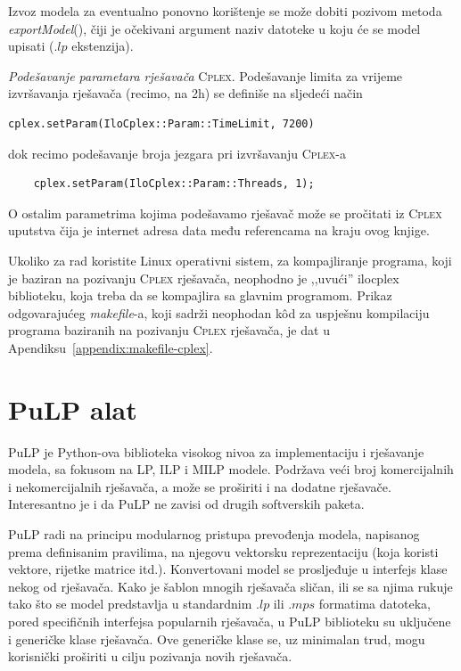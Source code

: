 \documentclass[b5paper, utf8, 11pt, colorlinks]{book}
\theoremstyle{definition}
\begin{document}
Izvoz modela za eventualno ponovno korištenje se može dobiti pozivom metoda \emph{exportModel}(), čiji je očekivani argument naziv datoteke u koju će se model upisati (.$lp$ ekstenzija).  

\emph{ {Podešavanje parametara rješavača}} \textrm{\textsc{Cplex}}. Podešavanje limita za vrijeme izvršavanja rješavača (recimo, na 2h) se definiše na sljedeći način
\begin{verbatim}
cplex.setParam(IloCplex::Param::TimeLimit, 7200)
\end{verbatim}
dok recimo podešavanje broja jezgara pri izvršavanju \textsc{Cplex}-a 
\begin{verbatim}
	cplex.setParam(IloCplex::Param::Threads, 1);
\end{verbatim}
O ostalim parametrima kojima podešavamo rješavač može se pročitati iz \textrm{\textsc{Cplex}} uputstva čija je internet adresa data  među referencama na kraju ovog knjige.

Ukoliko za rad koristite Linux operativni sistem, za kompajliranje programa, koji je baziran na pozivanju \textsc{Cplex} rješavača, neophodno  je ,,uvući'' ilocplex biblioteku, koja treba da se kompajlira sa glavnim programom. Prikaz odgovarajućeg \emph{makefile}-a, koji sadrži neophodan k\^od za uspješnu kompilaciju programa baziranih na pozivanju \textsc{Cplex} rješavača, je dat u Apendiksu~\ref{appendix:makefile-cplex}.

 \section{PuLP alat}
 PuLP je Python-ova biblioteka visokog nivoa za implementaciju i rješavanje modela, sa fokusom na LP, ILP i MILP modele.   Podržava veći broj komercijalnih i nekomercijalnih rješavača, a može se proširiti i na dodatne rješavače. Interesantno je i da PuLP  ne zavisi od  drugih softverskih paketa. 
 
   PuLP radi na principu modularnog pristupa prevođenja modela, napisanog prema definisanim pravilima, na njegovu vektorsku reprezentaciju (koja koristi vektore, rijetke matrice itd.). Konvertovani model se prosljeđuje u interfejs klase nekog od rješavača. Kako je šablon mnogih rješavača sličan, ili se sa njima rukuje tako što se model predstavlja u standardnim .$lp$ ili .$mps$  formatima  datoteka, pored specifičnih interfejsa popularnih rješavača, u PuLP biblioteku su uključene i  generičke klase rješavača. %
    Ove generičke klase se, uz minimalan trud, mogu korisnički proširiti u cilju pozivanja novih rješavača.    
 
\end{document}
